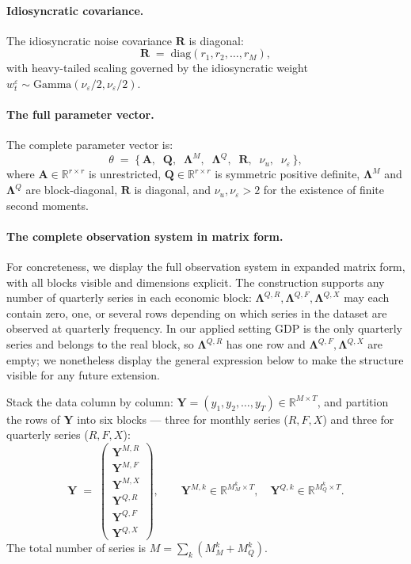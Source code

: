 \documentclass[11pt, a4paper, oneside]{article}
\newcommand{\mL}{\boldsymbol{\Lambda}}
\begin{document}
\paragraph{Idiosyncratic covariance.}
The idiosyncratic noise covariance $\mathbf{R}$ is diagonal:
\[
\mathbf{R} \;=\; \mathrm{diag}(r_1, r_2, \ldots, r_M),
\]
with heavy-tailed scaling governed by the idiosyncratic weight
$w^\varepsilon_t \sim \mathrm{Gamma}(\nu_\varepsilon/2, \nu_\varepsilon/2)$.

\paragraph{The full parameter vector.}
The complete parameter vector is:
\begin{equation}
\theta \;=\; \big\{\, \mathbf{A},\;\; \mathbf{Q},\;\; \mL^M,\;\; \mL^Q,\;\; \mathbf{R},\;\; \nu_u,\;\; \nu_\varepsilon \,\big\},
\label{eq:final-theta}
\end{equation}
where $\mathbf{A} \in \mathbb{R}^{r \times r}$ is unrestricted,
$\mathbf{Q} \in \mathbb{R}^{r \times r}$ is symmetric positive
definite, $\mL^M$ and $\mL^Q$ are
block-diagonal, $\mathbf{R}$ is diagonal, and
$\nu_u, \nu_\varepsilon > 2$ for the existence of finite second moments.

\paragraph{The complete observation system in matrix form.}
For concreteness, we display the full observation system in expanded
matrix form, with all blocks visible and dimensions explicit. The
construction supports any number of quarterly series in each
economic block: $\mL^{Q,R}, \mL^{Q,F}, \mL^{Q,X}$ may each contain
zero, one, or several rows depending on which series in the dataset
are observed at quarterly frequency. In our applied setting GDP is
the only quarterly series and belongs to the real block, so
$\mL^{Q,R}$ has one row and $\mL^{Q,F}, \mL^{Q,X}$ are empty; we
nonetheless display the general expression below to make the
structure visible for any future extension.

Stack the data column by column:
$\mathbf{Y} = (y_1, y_2, \ldots, y_T) \in \mathbb{R}^{M \times T}$,
and partition the rows of $\mathbf{Y}$ into six blocks — three for
monthly series ($R, F, X$) and three for quarterly series ($R, F, X$):
\[
\mathbf{Y} \;=\; \begin{pmatrix}
\mathbf{Y}^{M,R} \\
\mathbf{Y}^{M,F} \\
\mathbf{Y}^{M,X} \\
\hline
\mathbf{Y}^{Q,R} \\
\mathbf{Y}^{Q,F} \\
\mathbf{Y}^{Q,X}
\end{pmatrix}, \qquad
\mathbf{Y}^{M,k} \in \mathbb{R}^{M_M^k \times T},
\quad
\mathbf{Y}^{Q,k} \in \mathbb{R}^{M_Q^k \times T}.
\]
The total number of series is $M = \sum_{k} (M_M^k + M_Q^k)$.
\end{document}

